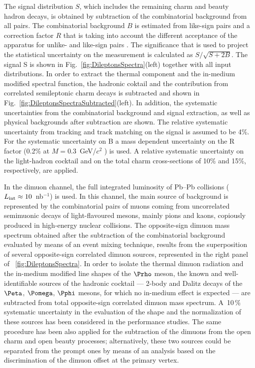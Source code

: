 \documentclass[../report.tex]{subfiles}
\begin{document}
The signal distribution $S$, which includes the remaining charm and beauty hadron decays, is obtained by subtraction of the combinatorial background from all \Pepem pairs. The combinatorial background $B$ is estimated from like-sign pairs and a correction factor $R$ that is taking into account the different acceptance of the apparatus for unlike- and like-sign pairs \cite{allLMeePapersRun1and2}. The significance that is used to project the statistical uncertainty on the measurement is calculated as $S/\sqrt{S+2B}$. The signal S is shown in Fig.~\ref{fig:DileptonsSpectra}(left) together with all input distributions. In order to extract the thermal component and the in-medium modified \Prho spectral function, the hadronic coktail and the contribution from correlated semileptonic charm decays is subtracted and shown in Fig.~\ref{fig:DileptonsSpectraSubtracted}(left). In addition, the systematic uncertainties from the combinatorial background and signal extraction, as well as physical backgrounds after subtraction are shown. The relative systematic uncertainty from tracking and track matching on the signal is assumed to be 4\%. For the systematic uncertainty on B a mass dependent uncertainty on the R factor (0.2\% at $M=0.3$~GeV/$c^2$ \cite{pp13 TeV paper}) is used. A relative systematic uncertainty on the light-hadron cocktail and on the total charm cross-sections of 10\% and 15\%, respectively, are applied.

In the dimuon channel, the full integrated luminosity of Pb--Pb collisions ($L_{\rm int}\approx 10$~nb$^{−1}$) is used. In this channel, the main source of background is represented by the combinatorial pairs of muons coming from uncorrelated semimuonic decays of light-flavoured mesons, mainly pions and kaons, copiously produced in high-energy nuclear collisions. The opposite-sign dimuon mass spectrum obtained after the subtraction of the combinatorial background evaluated by means of an event mixing technique, results from the superposition of several opposite-sign correlated dimuon sources, represented in the right panel of \figurename~\ref{fig:DileptonsSpectra}. In order to isolate the thermal dimuon radiation and the in-medium modified line shapes of the $\Prho$ meson, the known and well-identifiable sources of the hadronic cocktail --- 2-body and Dalitz decays of the $\Peta$, $\Pomega$, $\Pphi$ mesons, for which no in-medium effect is expected --- are subtracted from total opposite-sign correlated dimuon mass spectrum. A~10\,\% systematic uncertainty in the evaluation of the shape and the normalization of these sources has been considered in the performance studies. The same procedure has been also applied for the subtraction of the dimuons from the open charm and open beauty processes; alternatively, these two sources could be separated from the prompt ones by means of an analysis based on the discrimination of the dimuon offset at the primary vertex.
\end{document}
